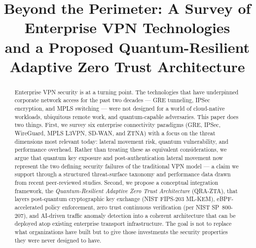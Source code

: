 \documentclass[conference]{IEEEtran}
\begin{document}
\title{Beyond the Perimeter: A Survey of Enterprise VPN Technologies\\
and a Proposed Quantum-Resilient Adaptive Zero Trust Architecture}

\author{
    \and
    \and
}

\maketitle

\begin{abstract}
Enterprise VPN security is at a turning point. The technologies
that have underpinned corporate network access for the past two
decades --- GRE tunneling, IPSec encryption, and MPLS switching
--- were not designed for a world of cloud-native workloads,
ubiquitous remote work, and quantum-capable adversaries. This
paper does two things. First, we survey six enterprise
connectivity paradigms (GRE, IPSec, WireGuard, MPLS L3VPN,
SD-WAN, and ZTNA) with a focus on the threat dimensions most
relevant today: lateral movement risk, quantum vulnerability,
and performance overhead. Rather than treating these as
equivalent considerations, we argue that quantum key exposure
and post-authentication lateral movement now represent the two
defining security failures of the traditional VPN model --- a
claim we support through a structured threat-surface taxonomy
and performance data drawn from recent peer-reviewed studies.
Second, we propose a conceptual integration framework, the
\textit{Quantum-Resilient Adaptive Zero Trust Architecture}
(QRA-ZTA), that layers post-quantum cryptographic key exchange
(NIST FIPS-203 ML-KEM), eBPF-accelerated policy enforcement,
zero trust continuous verification (per NIST SP~800-207), and
AI-driven traffic anomaly detection into a coherent architecture
that can be deployed atop existing enterprise transport
infrastructure. The goal is not to replace what organizations
have built but to give those investments the security properties
they were never designed to have.
\end{abstract}
\end{document}
